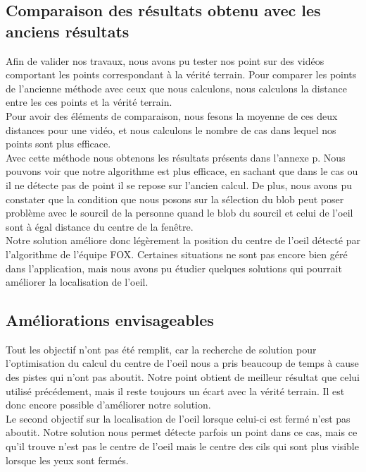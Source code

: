 \subsection{Comparaison des résultats obtenu avec les anciens résultats}
Afin de valider nos travaux, nous avons pu tester nos point sur des vidéos comportant les points correspondant à
la vérité terrain. Pour comparer les points de l'ancienne méthode avec ceux que nous calculons, nous calculons la
distance entre les ces points et la vérité terrain.\\

Pour avoir des éléments de comparaison, nous fesons la moyenne de ces deux distances pour une vidéo, et nous calculons
le nombre de cas dans lequel nos points sont plus efficace.\\

Avec cette méthode nous obtenons les résultats présents dans l'annexe p\pageref{resultatApplication}. Nous pouvons voir
que notre algorithme est plus efficace, en sachant que dans le cas ou il ne détecte pas de point il se repose sur l'ancien
calcul. De plus, nous avons pu constater que la condition que nous posons sur la sélection du blob peut poser problème 
avec le sourcil de la personne quand le blob du sourcil et celui de l'oeil sont à égal distance du centre de la fenêtre.\\

Notre solution améliore donc légèrement la position du centre de l'oeil détecté par l'algorithme de l'équipe FOX. Certaines
situations ne sont pas encore bien géré dans l'application, mais nous avons pu étudier quelques solutions qui pourrait améliorer
la localisation de l'oeil.

\subsection{Améliorations envisageables}
Tout les objectif n'ont pas été remplit, car la recherche de solution pour l'optimisation du calcul du centre de l'oeil
nous a pris beaucoup de temps à cause des pistes qui n'ont pas aboutit. Notre point obtient de meilleur résultat
que celui utilisé précédement, mais il reste toujours un écart avec la vérité terrain. Il est donc encore possible
d'améliorer notre solution.\\

Le second objectif sur la localisation de l'oeil lorsque celui-ci est fermé n'est pas aboutit. Notre solution
nous permet détecte parfois un point dans ce cas, mais ce qu'il trouve n'est pas le centre de l'oeil mais le
centre des cils qui sont plus visible lorsque les yeux sont fermés.